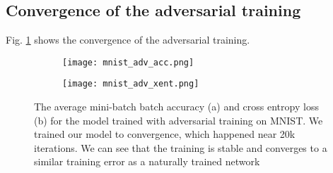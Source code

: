 \documentclass{article} %
\begin{document}
\subsection{Convergence of the adversarial training}
Fig. \ref{fig:mnist_acc} shows the convergence of the adversarial training.
\begin{figure}[htb]
\centering
\begin{subfigure}{.5\textwidth}
  \centering
  \texttt{[image: mnist\_adv\_acc.png]}
  \caption{}
\end{subfigure}%
\begin{subfigure}{.5\textwidth}
  \centering
  \texttt{[image: mnist\_adv\_xent.png]}
  \caption{}
\end{subfigure}
\caption{The average mini-batch batch accuracy (a) and cross entropy loss (b) for the model trained with adversarial training on MNIST. We trained our model to convergence, which happened near 20k iterations. We can see that the training is stable and converges to a similar training error as a naturally trained network}\label{fig:mnist_acc}
\end{figure}
\end{document}
